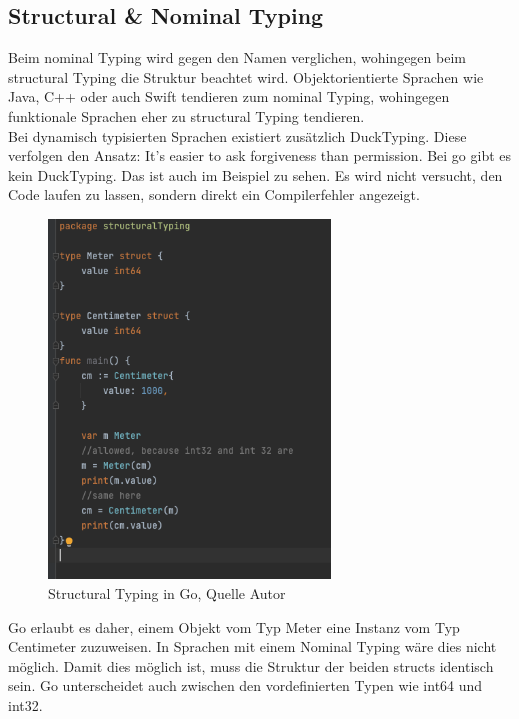 \documentclass[12pt,titlepage]{article}
\begin{document}
\subsection{Structural \& Nominal Typing}
Beim nominal Typing wird gegen den Namen verglichen, wohingegen beim structural Typing die Struktur beachtet wird. Objektorientierte Sprachen wie Java, C++ oder auch Swift tendieren zum nominal Typing, wohingegen funktionale Sprachen eher zu structural Typing tendieren. \\
Bei dynamisch typisierten Sprachen existiert zusätzlich DuckTyping. Diese verfolgen den Ansatz: It's easier to ask forgiveness than permission. Bei go gibt es kein DuckTyping. Das ist auch im Beispiel zu sehen. Es wird nicht versucht, den Code laufen zu lassen, sondern direkt ein Compilerfehler angezeigt. 
\begin{figure}
	\centering
	\includegraphics[width=7.5cm]{structuralTyping}
	\caption{Structural Typing in Go, Quelle Autor}\label{structuralTyping}
\end{figure}
Go erlaubt es daher, einem Objekt vom Typ Meter eine Instanz vom Typ Centimeter zuzuweisen. In Sprachen mit einem Nominal Typing wäre dies nicht möglich. Damit dies möglich ist, muss die Struktur der beiden structs identisch sein. Go unterscheidet auch zwischen den vordefinierten Typen wie int64 und int32. 
\end{document}
